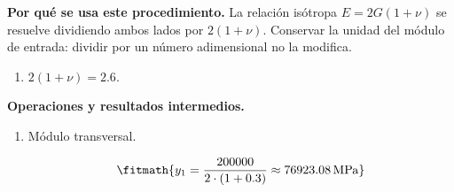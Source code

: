 \noindent\textbf{Por qué se usa este procedimiento.} La relación isótropa $E=2G(1+\nu)$ se resuelve dividiendo ambos lados por $2(1+\nu)$. Conservar la unidad del módulo de entrada: dividir por un número adimensional no la modifica.

\begin{enumerate}

\item $2(1 + \nu) = 2.6$.

\end{enumerate}

\noindent\textbf{Operaciones y resultados intermedios.}

\begin{enumerate}

\item Módulo transversal.

\[\fitmath{y_{1}=\frac{200000}{2\cdot \left(1+0.3\right)}\approx 76923.08\,\mathrm{MPa}}\]

\end{enumerate}
